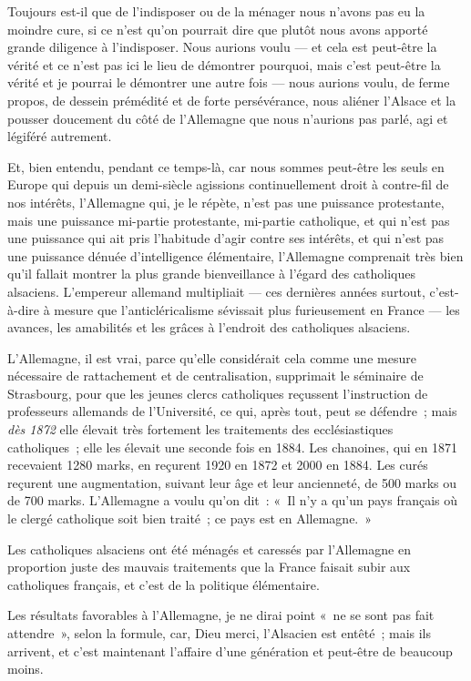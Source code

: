\documentclass[french,twoside]{book} %
\begin{document}
Toujours est-il que de l’indisposer ou de la ménager nous n’avons pas eu la moindre cure, si ce n’est qu’on pourrait dire que plutôt nous avons apporté grande diligence à l’indisposer. Nous aurions voulu — et cela est peut-être la vérité et ce n’est pas ici le lieu de démontrer pourquoi, mais c’est peut-être la vérité et je pourrai le démontrer une autre fois — nous aurions voulu, de ferme propos, de dessein prémédité et de forte persévérance, nous aliéner l’Alsace et la pousser doucement du côté de l’Allemagne que nous n’aurions pas parlé, agi et légiféré autrement.\par
Et, bien entendu, pendant ce temps-là, car nous sommes peut-être les seuls en Europe qui depuis un demi-siècle agissions continuellement droit à contre-fil de nos intérêts, l’Allemagne qui, je le répète, n’est pas une puissance protestante, mais une puissance mi-partie protestante, mi-partie catholique, et qui n’est pas une puissance qui ait pris l’habitude d’agir contre ses intérêts, et qui n’est pas une puissance dénuée d’intelligence élémentaire, l’Allemagne comprenait très  bien qu’il fallait montrer la plus grande bienveillance à l’égard des catholiques alsaciens. L’empereur allemand multipliait — ces dernières années surtout, c’est-à-dire à mesure que l’anticléricalisme sévissait plus furieusement en France — les avances, les amabilités et les grâces à l’endroit des catholiques alsaciens.\par
L’Allemagne, il est vrai, parce qu’elle considérait cela comme une mesure nécessaire de rattachement et de centralisation, supprimait le séminaire de Strasbourg, pour que les jeunes clercs catholiques reçussent l’instruction de professeurs allemands de l’Université, ce qui, après tout, peut se défendre ; mais {\itshape dès 1872} elle élevait très fortement les traitements des ecclésiastiques catholiques ; elle les élevait une seconde fois en 1884. Les chanoines, qui en 1871 recevaient 1280 marks, en reçurent 1920 en 1872 et 2000 en 1884. Les curés reçurent une augmentation, suivant leur âge et leur ancienneté, de 500 marks ou de 700 marks. L’Allemagne a voulu qu’on dit : « Il n’y a qu’un pays français où le clergé catholique soit bien traité ; ce pays est en Allemagne. »\par
Les catholiques alsaciens ont été ménagés et caressés par l’Allemagne en proportion juste des mauvais traitements que la France faisait subir  aux catholiques français, et c’est de la politique élémentaire.\par
Les résultats favorables à l’Allemagne, je ne dirai point « ne se sont pas fait attendre », selon la formule, car, Dieu merci, l’Alsacien est entêté ; mais ils arrivent, et c’est maintenant l’affaire d’une génération et peut-être de beaucoup moins.\par
\end{document}
